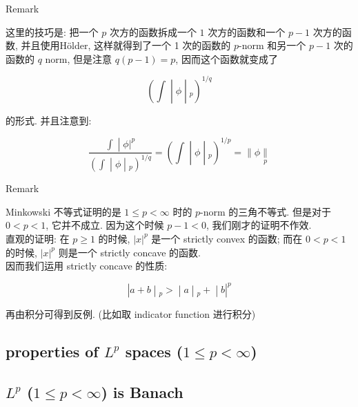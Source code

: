 \documentclass{qlnotes-export}
\begin{document}
\begin{qlremark}{Remark}

这里的技巧是: 把一个 \(p\) 次方的函数拆成一个 \(1\) 次方的函数和一个 \(p - 1\) 次方的函数, 并且使用Hölder, 这样就得到了一个 1 次的函数的 \(p\)-norm 和另一个 \(p - 1\) 次的函数的 \(q\) norm, 但是注意 \(q(p - 1) = p\), 因而这个函数就变成了

\[\left. (\int \middle| \phi \middle| {}_{p})^{1/q} \right.\]

的形式. 并且注意到:

\[\left. \frac{\left. \int \middle| \phi|^{p} \right.}{\left. (\int \middle| \phi \middle| {}_{p})^{1/q} \right.} = (\int \middle| \phi \middle| {}_{p})^{1/p} = \parallel \phi\underset{p}{\parallel} \right.\]

\end{qlremark}

\begin{qlremark}{Remark}

Minkowski 不等式证明的是 \(1 \leq p < \infty\) 时的 \(p\)-norm 的三角不等式. 但是对于 \(0 < p < 1\), 它并不成立. 因为这个时候 \(p - 1 < 0\), 我们刚才的证明不作效.\\
直观的证明: 在 \(p \geq 1\) 的时候, \(|x|^{p}\) 是一个 strictly convex 的函数; 而在 \(0 < p < 1\) 的时候, \(|x|^{p}\) 则是一个 strictly concave 的函数.\\
因而我们运用 strictly concave 的性质:

\[\left. |a + b \middle| {}_{p} > \middle| a \middle| {}_{p} + \middle| b|^{p} \right.\]

再由积分可得到反例. (比如取 indicator function 进行积分)

\end{qlremark}

\subsection{\texorpdfstring{properties of \(L^{p}\) spaces (\(1 \leq p < \infty\))}{properties of L\^{}\{p\} spaces (1 \textbackslash leq p \textless{} \textbackslash infty)}}\label{properties-of-lp-spaces-1-leq-p-infty}

\subsection{\texorpdfstring{\(L^{p}\) (\(1 \leq p < \infty\)) is Banach}{L\^{}\{p\} (1 \textbackslash leq p \textless{} \textbackslash infty) is Banach}}\label{lp-1-leq-p-infty-is-banach}
\end{document}
